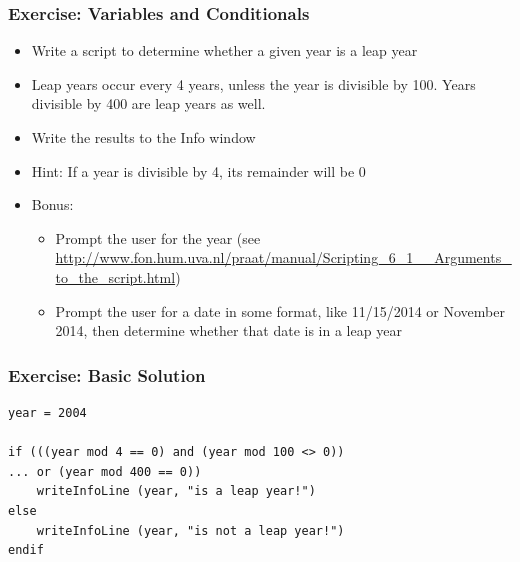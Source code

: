 \documentclass[handout]{beamer}
\begin{document}
    



\begin{frame}[fragile]
\frametitle{Exercise: Variables and Conditionals}
\begin{itemize}
    \item Write a script to determine whether a given year is a leap year
    \item Leap years occur every 4 years, unless the year is divisible by 100. Years divisible by 400 are leap years as well.
    \item Write the results to the Info window
    \item Hint: If a year is divisible by 4, its remainder will be 0
    \item Bonus:
    \begin{itemize}
        \item Prompt the user for the year (see \url{http://www.fon.hum.uva.nl/praat/manual/Scripting_6_1__Arguments_to_the_script.html})
        \item Prompt the user for a date in some format, like 11/15/2014 or November 2014, then determine whether that date is in a leap year
    \end{itemize}
\end{itemize}
\end{frame}

\begin{frame}[fragile]
\frametitle{Exercise: Basic Solution}
    
\begin{verbatim}
year = 2004

if (((year mod 4 == 0) and (year mod 100 <> 0))
... or (year mod 400 == 0))
    writeInfoLine (year, "is a leap year!")
else
    writeInfoLine (year, "is not a leap year!")
endif
\end{verbatim}

\end{frame}
\end{document}
